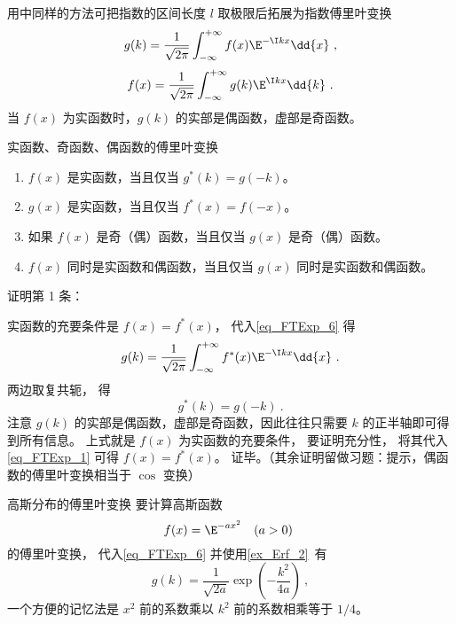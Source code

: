 

用中同样的方法可把指数的区间长度 $l$ 取极限后拓展为指数傅里叶变换
\begin{equation}\label{eq_FTExp_6}
g(k) = \frac{1}{\sqrt{2\pi }} \int_{-\infty }^{+\infty } f(x)\E^{-\I kx} \dd{x}~,
\end{equation}
\begin{equation}\label{eq_FTExp_1}
f(x) = \frac{1}{\sqrt{2\pi }} \int_{-\infty }^{+\infty } g(k)\E^{\I kx} \dd{k}~.
\end{equation}
当 $f(x)$ 为实函数时，$g(k)$ 的实部是偶函数，虚部是奇函数。

\begin{theorem}{实函数、奇函数、偶函数的傅里叶变换}\label{the_FTExp_1}
\begin{enumerate}
\item $f(x)$ 是实函数，当且仅当 $g^*(k) = g(-k)$。
\item $g(x)$ 是实函数，当且仅当 $f^*(x) = f(-x)$。
\item 如果 $f(x)$ 是奇（偶）函数，当且仅当 $g(x)$ 是奇（偶）函数。
\item $f(x)$ 同时是实函数和偶函数，当且仅当 $g(x)$ 同时是实函数和偶函数。
\end{enumerate}
\end{theorem}
证明第 1 条：

实函数的充要条件是 $f(x) = f^*(x)$， 代入\autoref{eq_FTExp_6} 得
\begin{equation}
g(k) = \frac{1}{\sqrt{2\pi }} \int_{-\infty }^{+\infty } f^*(x)\E^{-\I kx} \dd{x}~.
\end{equation}
两边取复共轭， 得
\begin{equation}\label{eq_FTExp_5}
g^*(k) = g(-k)~.
\end{equation}
注意 $g(k)$ 的实部是偶函数，虚部是奇函数，因此往往只需要 $k$ 的正半轴即可得到所有信息。 上式就是 $f(x)$ 为实函数的充要条件， 要证明充分性， 将其代入\autoref{eq_FTExp_1} 可得 $f(x) = f^*(x)$。 证毕。（其余证明留做习题：提示，偶函数的傅里叶变换相当于 $\cos$ 变换）

\begin{example}{高斯分布的傅里叶变换}\label{ex_FTExp_1}
要计算高斯函数
\begin{equation}
f(x) = \E^{-ax^2} \quad (a > 0)~
\end{equation}
的傅里叶变换， 代入\autoref{eq_FTExp_6} 并使用\autoref{ex_Erf_2}~有
\begin{equation}
g(k) = \frac{1}{\sqrt{2a}} \exp(-\frac{k^2}{4a})~,
\end{equation}
一个方便的记忆法是 $x^2$ 前的系数乘以 $k^2$ 前的系数相乘等于 $1/4$。
\end{example}

